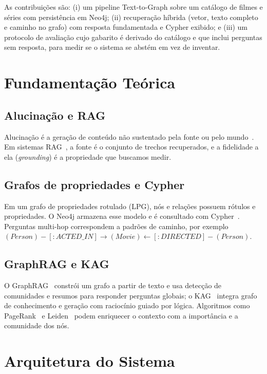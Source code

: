 \documentclass[12pt]{article}
\begin{document}
As contribuições são: (i) um pipeline Text-to-Graph sobre um catálogo de filmes e séries com
persistência em Neo4j; (ii) recuperação híbrida (vetor, texto completo e caminho no grafo) com
resposta fundamentada e Cypher exibido; e (iii) um protocolo de avaliação cujo gabarito é derivado
do catálogo e que inclui perguntas sem resposta, para medir se o sistema se abstém em vez de inventar.

\section{Fundamentação Teórica}

\subsection{Alucinação e RAG}
Alucinação é a geração de conteúdo não sustentado pela fonte ou pelo mundo~\cite{ji2023survey}. Em
sistemas RAG~\cite{lewis2020rag}, a fonte é o conjunto de trechos recuperados, e a fidelidade a ela
(\emph{grounding}) é a propriedade que buscamos medir.

\subsection{Grafos de propriedades e Cypher}
Em um grafo de propriedades rotulado (LPG), nós e relações possuem rótulos e propriedades. O Neo4j
armazena esse modelo e é consultado com Cypher~\cite{francis2018cypher}. Perguntas multi-hop
correspondem a padrões de caminho, por exemplo
$(Person)\!-\![:ACTED\_IN]\!\rightarrow\!(Movie)\!\leftarrow\![:DIRECTED]\!-\!(Person)$.

\subsection{GraphRAG e KAG}
O GraphRAG~\cite{edge2024graphrag} constrói um grafo a partir de texto e usa detecção de
comunidades e resumos para responder perguntas globais; o KAG~\cite{liang2024kag} integra grafo de
conhecimento e geração com raciocínio guiado por lógica. Algoritmos como PageRank~\cite{page1999pagerank}
e Leiden~\cite{traag2019leiden} podem enriquecer o contexto com a importância e a comunidade dos nós.

\section{Arquitetura do Sistema}
\end{document}
